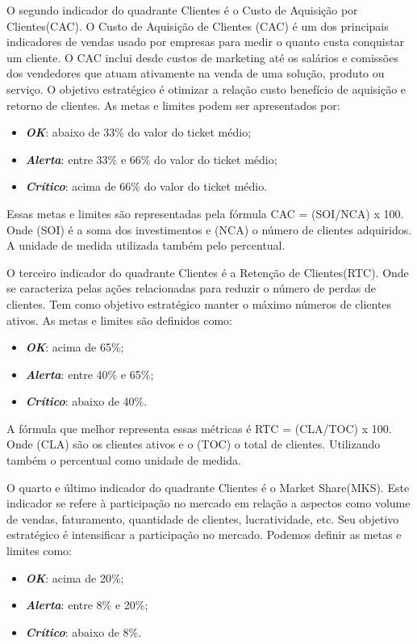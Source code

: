 \documentclass[
	12pt,				%
	openright,			%
	oneside,			%
	a4paper,			%
	english,			%
	brazil				%
	]{abntex2}
\begin{document}
O segundo indicador do quadrante Clientes é o Custo de Aquisição por Clientes(CAC). O Custo de Aquisição de Clientes (CAC) é um dos principais indicadores de vendas usado por empresas para medir o quanto custa conquistar um cliente. O CAC inclui desde custos de marketing até os salários e comissões dos vendedores que atuam ativamente na venda de uma solução, produto ou serviço. O objetivo estratégico é otimizar a relação custo benefício de aquisição e retorno de clientes. As metas e limites podem ser apresentados por:
\begin{itemize}
\item  \textbf{\textit{OK}}: abaixo de 33\% do valor do ticket médio;
\item  \textbf{\textit{Alerta}}: entre 33\% e 66\% do valor do ticket médio;
\item  \textbf{\textit{Crítico}}: acima de 66\% do valor do ticket médio.
\end{itemize}

Essas metas e limites são representadas pela fórmula CAC = (SOI/NCA) x 100. Onde (SOI) é a soma dos investimentos e (NCA) o número de clientes adquiridos. A unidade de medida utilizada também pelo percentual.

O terceiro indicador do quadrante Clientes é a Retenção de Clientes(RTC). Onde se caracteriza pelas ações relacionadas para reduzir o número de perdas de clientes. Tem como objetivo estratégico manter o máximo números de clientes ativos. As metas e limites são definidos como:
\begin{itemize}
\item  \textbf{\textit{OK}}: acima de 65\%;
\item  \textbf{\textit{Alerta}}: entre 40\% e 65\%;
\item  \textbf{\textit{Crítico}}: abaixo de 40\%.
\end{itemize}

A fórmula que melhor representa essas métricas é RTC = (CLA/TOC) x 100. Onde (CLA) são os clientes ativos e o (TOC) o total de clientes. Utilizando também o percentual como unidade de medida.

O quarto e último indicador do quadrante Clientes é o Market Share(MKS). Este indicador se refere à participação no mercado em relação a aspectos como volume de vendas, faturamento, quantidade de clientes, lucratividade, etc. Seu objetivo estratégico é intensificar a participação no mercado. Podemos definir as metas e limites como:
\begin{itemize}
\item  \textbf{\textit{OK}}: acima de 20\%;
\item  \textbf{\textit{Alerta}}: entre 8\% e 20\%;
\item  \textbf{\textit{Crítico}}: abaixo de 8\%.
\end{itemize}
\end{document}
